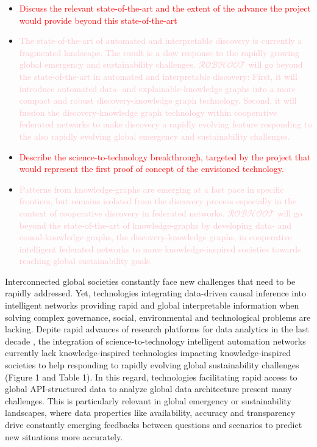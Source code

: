 \documentclass[11pt, a4paper]{article} %
\begin{document}
\begin{itemize}
\item \textcolor{red}{Discuss the relevant state-of-the-art and the
    extent of the advance the project would provide beyond this
    state-of-the-art}
\item \textcolor{pink}{The state-of-the-art of automated and
    interpretable discovery is currently a fragmented landscape. The
    result is a slow response to the rapidly growing global emergency
    and sustainability challenges. $\mathcal{ROBHOOT}$ will go beyond
    the state-of-the-art in automated and interpretable discovery:
    First, it will introduce automated data- and explainable-knowledge
    graphs into a more compact and robust discovery-knowledge graph
    technology. Second, it will fussion the discovery-knowledge graph
    technology within cooperative federated networks to make discovery
    a rapidly evolving feature responding to the also rapidly evolving
    global emergency and sustainability challenges.}
\item \textcolor{red}{Describe the science-to-technology breakthrough,
    targeted by the project that would represent the first proof of
    concept of the envisioned technology.}
\item \textcolor{pink}{Patterns from knowledge-graphs are emerging at
    a fast pace in specific frontiers, but remains isolated from the
    discovery process especially in the context of cooperative
    discovery in federated networks. $\mathcal{ROBHOOT}$ will go
    beyond the state-of-the-art of knowledge-graphs by developing
    data- and causal-knowledge graphs, the discovery-knowledge graphs,
    in cooperative intelligent federated networks to move
    knowledge-inspired societies towards reaching global
    sustainability goals.}
\end{itemize}

Interconnected global societies constantly face new challenges that
need to be rapidly addressed. Yet, technologies integrating
data-driven causal inference into intelligent networks providing rapid
and global interpretable information when solving complex governance,
social, environmental and technological problems are lacking. Depite
rapid advances of research platforms for data analytics in the last
decade
\citep{Melniketal:2010,Steinruecken,Modulos,Guimera2020,GoogleAI,IrisAI,easeml,datarobot,aito},
the integration of science-to-technology intelligent automation
networks currently lack knowledge-inspired technologies impacting
knowledge-inspired societies to help responding to rapidly evolving
global sustainability challenges (Figure 1 and Table 1). In this
regard, technologies facilitating rapid access to global
API-structured data to analyze global data architecture present many
challenges. This is particularly relevant in global emergency or
sustainability landscapes, where data properties like availability,
accuracy and transparency drive constantly emerging feedbacks between
questions and scenarios to predict new situations more accurately.
\end{document}
